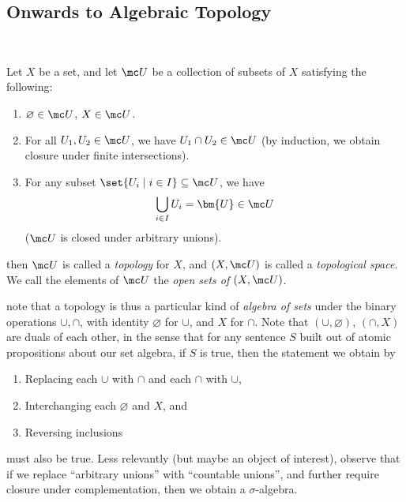 \documentclass{fkbook}
\begin{document}
\begin{adjustwidth}{1em}{1em}
  \subsection{Onwards to Algebraic Topology}~
  \vspace{-.75em}
  \begin{definition}
    Let $X$ be a set, and let $\mc U$ be a collection of subsets of
    $X$ satisfying the following:
    \begin{enumerate}[label=(\roman*)]
      \item $\varnothing \in \mc U$, $X \in \mc U$.
      \item For all $U_1, U_2 \in \mc U$, we have $U_1 \cap U_2 \in
        \mc U$ (by induction, we obtain closure under finite
        intersections).
      \item For any subset $\set{U_i \mid i \in I} \subseteq \mc U$,
        we have
        \[
          \bigcup_{i \in I} U_i = \bm{U} \in \mc U
        \]
        ($\mc U$ is closed under arbitrary unions).
    \end{enumerate}
    then $\mc U$ is called a \emph{topology} for $X$, and $(X, \mc U)$
    is called a \emph{topological space}. We call the elements of $\mc
    U$ the \emph{open sets of} $(X, \mc U)$.
  \end{definition}
  note that a topology is thus a particular kind of \emph{algebra of
    sets} under the binary operations $\cup, \cap$, with identity
  $\varnothing$ for $\cup$, and $X$ for $\cap$. Note that $(\cup,
  \varnothing)$, $(\cap, X)$ are duals of each other, in the sense
  that for any sentence $S$ built out of atomic propositions about our
  set algebra, if $S$ is true, then the statement we obtain by
  \begin{enumerate}[label=\arabic*.]
    \item Replacing each $\cup$ with $\cap$ and each $\cap$ with
      $\cup$,
    \item Interchanging each $\varnothing$ and $X$, and
    \item Reversing inclusions
  \end{enumerate}
  must also be true. Less relevantly (but maybe an object of
  interest), observe that if we replace ``arbitrary unions'' with
  ``countable unions'', and further require closure under
  complementation, then we obtain a $\sigma$-algebra.


\end{adjustwidth}
\end{document}
